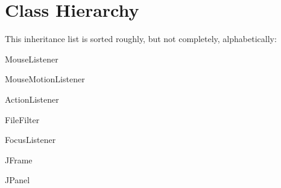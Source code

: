 \section{Class Hierarchy}
This inheritance list is sorted roughly, but not completely, alphabetically\-:\begin{DoxyCompactList}
\item Mouse\-Listener\begin{DoxyCompactList}
\item {}
\end{DoxyCompactList}
\item Mouse\-Motion\-Listener\begin{DoxyCompactList}
\item {}
\end{DoxyCompactList}
\item {}
\item {}
\item {}
\item Action\-Listener\begin{DoxyCompactList}
\item {}
\end{DoxyCompactList}
\item File\-Filter\begin{DoxyCompactList}
\item {}
\end{DoxyCompactList}
\item Focus\-Listener\begin{DoxyCompactList}
\item {}
\end{DoxyCompactList}
\item J\-Frame\begin{DoxyCompactList}
\item {}
\item {}
\end{DoxyCompactList}
\item J\-Panel\begin{DoxyCompactList}
\item {}
\item {}
\end{DoxyCompactList}
\end{DoxyCompactList}
